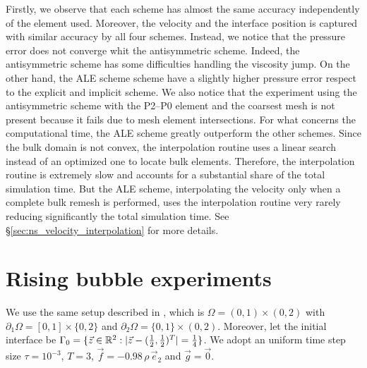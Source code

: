 Firstly, we observe that each scheme has almost the same accuracy independently
of the element used. Moreover, the velocity and the interface position is
captured with similar accuracy by all four schemes. Instead, we notice that the
pressure error does not converge whit the antisymmetric scheme. Indeed, the
antisymmetric scheme has some difficulties handling the viscosity jump. On the
other hand, the ALE scheme scheme have a slightly higher pressure error respect
to the explicit and implicit scheme. We also notice that the experiment using
the antisymmetric scheme with the P2--P0 element and the coarsest mesh is not
present because it fails due to mesh element intersections. For what concerns
the computational time, the ALE scheme greatly outperform the other schemes.
Since the bulk domain is not convex, the interpolation routine uses a linear
search instead of an optimized one to locate bulk elements. Therefore, the
interpolation routine is extremely slow and accounts for a substantial share
of the total simulation time. But the ALE scheme, interpolating the velocity
only when a complete bulk remesh is performed, uses the interpolation routine
very rarely reducing significantly the total simulation time. See
\S\ref{sec:ns_velocity_interpolation} for more details.

\section{Rising bubble experiments}\label{sec:2d_rising_bubble_results}
We use the same  setup described in \cite[Figure~2]{HysingTKPBGT09}, which is
${\Omega = (0,1) \times (0,2)}$ with $\partial_1\Omega = [0,1] \times \{0,2\}$
and $\partial_2\Omega = \{0,1\} \times (0,2)$. Moreover, let the initial
interface be ${\Gamma_0 = \{\vec z \in \mathbb R^2 : |\vec z - (\frac{1}{2},
\frac{1}{2})^T| = \frac{1}{4}\}}$.  We adopt an uniform time step size
$\tau=10^{-3}$, $T=3$, $\vec f = -0.98\,\rho\,\vec e_2$ and $\vec g=\vec 0$.


